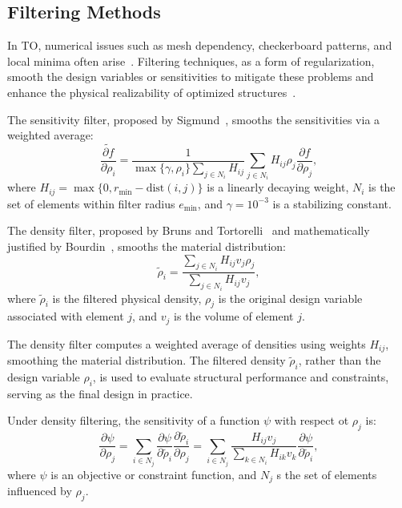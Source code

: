 \documentclass[mathpazo]{cicp}
\begin{document}
\subsection{Filtering Methods}
In TO, numerical issues such as mesh dependency, checkerboard patterns, and local minima often arise~\cite{bendsoe2013topology}. Filtering techniques, as a form of regularization, smooth the design variables or sensitivities to mitigate these problems and enhance the physical realizability of optimized structures~\cite{sigmund1998numerical,sigmund2007morphology}.

The sensitivity filter, proposed by Sigmund~\cite{sigmund1997design}, smooths the sensitivities via a weighted average:
\begin{equation*}
	\widetilde{\frac{\partial{f}}{\partial\rho_i}} = \frac{1}{\max\{\gamma,\rho_i\}\sum_{j\in{N}_i}H_{ij}}
	\sum_{j\in{N}_i}H_{ij}\rho_j\frac{\partial{f}}{\partial\rho_j},
\end{equation*}
where $H_{ij} = \max\{0, r_{\min}-\text{dist}(i,j)\}$ is a linearly decaying weight, $N_i$ is the set of elements within filter radius $e_{\min}$, and $\gamma = 10^{-3}$ is a stabilizing constant.

The density filter, proposed by Bruns and Tortorelli~\cite{bruns2001topology} and mathematically justified by Bourdin~\cite{bourdin2001filters}, smooths the material distribution:
\begin{equation*}
	\tilde\rho_i = \frac{\sum_{j\in{N}_i}H_{ij}v_j\rho_j}{\sum_{j\in{N}_i}H_{ij}v_j},
\end{equation*}
where $\tilde{\rho}_i$ is the filtered physical density, $\rho_j$ is the original design variable associated with element $j$, and $v_j$ is the volume of element $j$.

The density filter computes a weighted average of densities using weights $H_{ij}$, smoothing the material distribution. The filtered density $\tilde{\rho}_i$, rather than the design variable $\rho_i$, is used to evaluate structural performance and constraints, serving as the final design in practice.

Under density filtering, the sensitivity of a function $\psi$ with respect ot $\rho_j$ is:
\begin{equation*}
	\frac{\partial\psi}{\partial{\rho}_j} = \sum_{i\in{N}_j}\frac{\partial\psi}{\partial\tilde\rho_i}\frac{\partial\tilde\rho_i}{\partial\rho_j} = \sum_{i\in{N}_j}\frac{H_{ij}v_j}{\sum_{k\in{N}_i}H_{ik}v_k}\frac{\partial\psi}{\partial\tilde\rho_i},
\end{equation*}
where $\psi$ is an objective or constraint function, and $N_j$ s the set of elements influenced by $\rho_j$.
\end{document}
